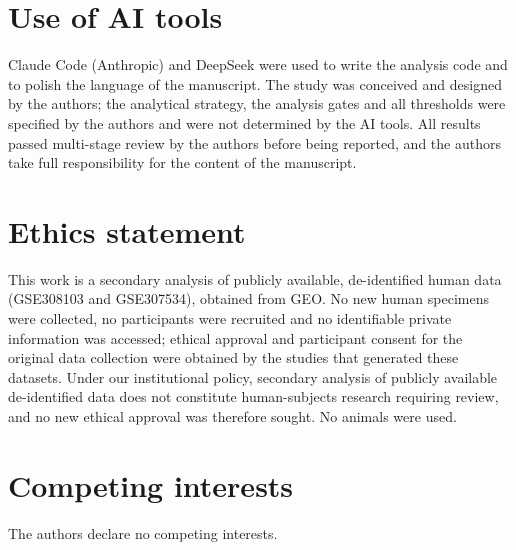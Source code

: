 \section*{Use of AI tools}
Claude Code (Anthropic) and DeepSeek were used to write the analysis code and to polish
the language of the manuscript. The study was conceived and designed by the authors; the
analytical strategy, the analysis gates and all thresholds were specified by the authors
and were not determined by the AI tools. All results passed multi-stage review by the
authors before being reported, and the authors take full responsibility for the content of
the manuscript.

\section*{Ethics statement}
This work is a secondary analysis of publicly available, de-identified human data
(GSE308103 and GSE307534), obtained from GEO. No new human specimens were collected, no
participants were recruited and no identifiable private information was accessed; ethical
approval and participant consent for the original data collection were obtained by the
studies that generated these datasets. Under our institutional policy, secondary analysis
of publicly available de-identified data does not constitute human-subjects research
requiring review, and no new ethical approval was therefore sought. No animals were used.

\section*{Competing interests}
The authors declare no competing interests.
